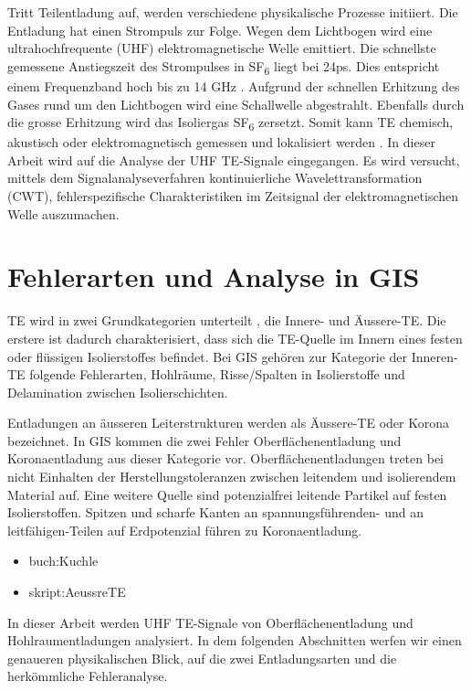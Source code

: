 \begin{refsection}
Tritt Teilentladung auf, werden verschiedene  physikalische Prozesse initiiert. 
Die Entladung hat einen Strompuls zur Folge.
Wegen dem Lichtbogen wird eine ultrahochfrequente (UHF) elektromagnetische Welle emittiert.
Die schnellste gemessene Anstiegszeit des Strompulses in SF\textsubscript{6} liegt bei 24ps.
Dies entspricht einem Frequenzband hoch bis zu 14 GHz \cite{skript:Judd24ps}. 
Aufgrund der schnellen Erhitzung des Gases rund um den Lichtbogen wird eine Schallwelle abgestrahlt. 
Ebenfalls durch die grosse Erhitzung wird das Isoliergas SF\textsubscript{6} zersetzt. 
Somit kann TE chemisch, akustisch oder elektromagnetisch gemessen und lokalisiert werden \cite{skript:StatusReviewPDMeasurement}.
In dieser Arbeit wird auf die Analyse der UHF TE-Signale eingegangen.
Es wird versucht, mittels dem Signalanalyseverfahren kontinuierliche Wavelettransformation (CWT), fehlerspezifische Charakteristiken im Zeitsignal der elektromagnetischen Welle auszumachen.

\section{Fehlerarten und Analyse in GIS}

TE wird in zwei Grundkategorien unterteilt \cite{buch:Kuchler}, die Innere- und Äussere-TE. 
Die erstere ist dadurch charakterisiert, dass sich die TE-Quelle im Innern eines festen oder flüssigen Isolierstoffes befindet. 
Bei GIS gehören zur Kategorie der Inneren-TE folgende Fehlerarten, Hohlräume, Risse/Spalten in Isolierstoffe und Delamination zwischen Isolierschichten.
 
Entladungen an äusseren Leiterstrukturen werden als Äussere-TE oder Korona bezeichnet. 
In GIS kommen die zwei Fehler Oberflächenentladung und Koronaentladung aus dieser Kategorie vor.
Oberflächenentladungen treten bei nicht Einhalten der Herstellungstoleranzen zwischen leitendem und isolierendem Material auf.
Eine weitere Quelle sind potenzialfrei leitende Partikel auf festen Isolierstoffen.
Spitzen und scharfe Kanten an spannungsführenden- und an leitfähigen-Teilen auf Erdpotenzial führen zu Koronaentladung. \begin{itemize}
	\item buch:Kuchle
	\item skript:AeussreTE
\end{itemize}
In dieser Arbeit werden UHF TE-Signale von Oberflächenentladung und Hohlraumentladungen analysiert. 
In dem folgenden Abschnitten werfen wir einen genaueren physikalischen Blick, auf die zwei Entladungsarten und die herkömmliche Fehleranalyse.


\end{refsection}
